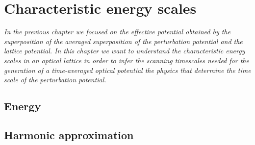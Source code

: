 \chapter{Characteristic energy scales}

\textit{In the previous chapter we focused on the effective potential obtained
by the superposition of the averaged superposition of the perturbation
potential and the lattice potential. In this chapter we want to understand the
characteristic energy scales in an optical lattice in order to infer the
scanning timescales needed for the generation of a time-averaged optical
potential the physics that determine the time scale of the perturbation
potential.}

\section{Energy}

\section{Harmonic approximation}

